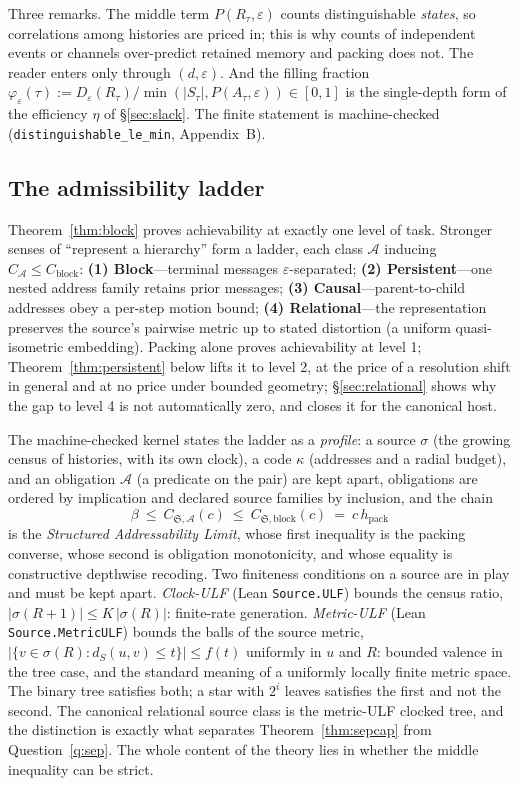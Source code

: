 \documentclass[11pt,reqno]{amsart}
\theoremstyle{plain}
\theoremstyle{definition}
\newcommand{\hpack}{h_{\mathrm{pack}}}
\newcommand{\Cblock}{C_{\mathrm{block}}}
\newcommand{\eps}{\varepsilon}
\begin{document}
Three remarks. The middle term $P(R_\tau,\eps)$ counts distinguishable \emph{states}, so correlations among histories are priced in; this is why counts of independent events or channels over-predict retained memory and packing does not. The reader enters only through $(d,\eps)$. And the filling fraction $\varphi_\eps(\tau):=D_\eps(R_\tau)/\min(|S_\tau|,P(A_\tau,\eps))\in[0,1]$ is the single-depth form of the efficiency $\eta$ of \S\ref{sec:slack}. The finite statement is machine-checked (\texttt{distinguishable\_le\_min}, Appendix~B).

\subsection{The admissibility ladder}\label{sec:ladder}

Theorem~\ref{thm:block} proves achievability at exactly one level of task. Stronger senses of ``represent a hierarchy'' form a ladder, each class $\mathcal A$ inducing $C_{\mathcal A}\le\Cblock$: \textbf{(1) Block}---terminal messages $\eps$-separated; \textbf{(2) Persistent}---one nested address family retains prior messages; \textbf{(3) Causal}---parent-to-child addresses obey a per-step motion bound; \textbf{(4) Relational}---the representation preserves the source's pairwise metric up to stated distortion (a uniform quasi-isometric embedding). Packing alone proves achievability at level 1; Theorem~\ref{thm:persistent} below lifts it to level 2, at the price of a resolution shift in general and at no price under bounded geometry; \S\ref{sec:relational} shows why the gap to level 4 is not automatically zero, and closes it for the canonical host.

The machine-checked kernel states the ladder as a \emph{profile}: a source $\sigma$ (the growing census of histories, with its own clock), a code $\kappa$ (addresses and a radial budget), and an obligation $\mathcal A$ (a predicate on the pair) are kept apart, obligations are ordered by implication and declared source families by inclusion, and the chain
\[
\beta\ \le\ C_{\mathfrak S,\mathcal A}(c)\ \le\ C_{\mathfrak S,\mathrm{block}}(c)\ =\ c\,\hpack
\]
is the \emph{Structured Addressability Limit}, whose first inequality is the packing converse, whose second is obligation monotonicity, and whose equality is constructive depthwise recoding. Two finiteness conditions on a source are in play and must be kept apart. \emph{Clock-ULF} (Lean \texttt{Source.ULF}) bounds the census ratio, $|\sigma(R{+}1)|\le K\,|\sigma(R)|$: finite-rate generation. \emph{Metric-ULF} (Lean \texttt{Source.MetricULF}) bounds the balls of the source metric, $|\{v\in\sigma(R):d_S(u,v)\le t\}|\le f(t)$ uniformly in $u$ and $R$: bounded valence in the tree case, and the standard meaning of a uniformly locally finite metric space. The binary tree satisfies both; a star with $2^i$ leaves satisfies the first and not the second. The canonical relational source class is the metric-ULF clocked tree, and the distinction is exactly what separates Theorem~\ref{thm:sepcap} from Question~\ref{q:sep}. The whole content of the theory lies in whether the middle inequality can be strict.
\end{document}
